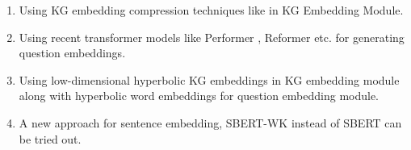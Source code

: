 \begin{enumerate}
    \item Using KG embedding compression techniques like \cite{kge_compression} in KG Embedding Module. 
    \item Using recent transformer models like Performer \cite{performer}, Reformer \cite{reformer} etc. for generating question embeddings.
    \item Using low-dimensional hyperbolic KG embeddings \cite{chami-etal-2020-low} in KG embedding module along with hyperbolic word embeddings \cite{dhingra-etal-2018-embedding} for question embedding module.
    \item A new approach for sentence embedding, SBERT-WK \cite{SBERT-WK} instead of SBERT \cite{reimers-2019-sentence-bert} can be tried out.
\end{enumerate}
